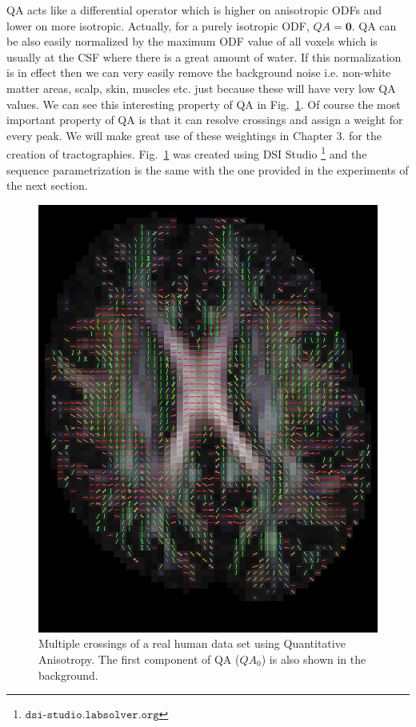 \documentclass{bioinfo}
\begin{document}
QA acts like a differential operator which is higher on anisotropic
ODFs and lower on more isotropic. Actually, for a purely isotropic
ODF, $QA=\bm{0}$. QA can be also easily normalized by the maximum
ODF value of all voxels which is usually at the CSF where there is
a great amount of water. If this normalization is in effect then we
can very easily remove the background noise i.e. non-white matter
areas, scalp, skin, muscles etc. just because these will have very
low QA values. We can see this interesting property of QA in Fig.~\ref{Flo:QA_directions}.
Of course the most important property of QA is that it can resolve
crossings and assign a weight for every peak. We will make great use
of these weightings in Chapter 3. for the creation of tractographies.
Fig.~\ref{Flo:QA_directions} was created using DSI Studio %
\footnote{$\texttt{dsi-studio.labsolver.org}$%
} and the sequence parametrization is the same with the one provided
in the experiments of the next section.

%
\begin{figure}
[th!]

\begin{centering}
\includegraphics[scale=0.4]{figures/dsi_studio_result}
\par\end{centering}

\caption{Multiple crossings of a real human data set using Quantitative Anisotropy.
The first component of QA ($QA_{0}$) is also shown in the background.}


\label{Flo:QA_directions}
\end{figure}
\end{document}
